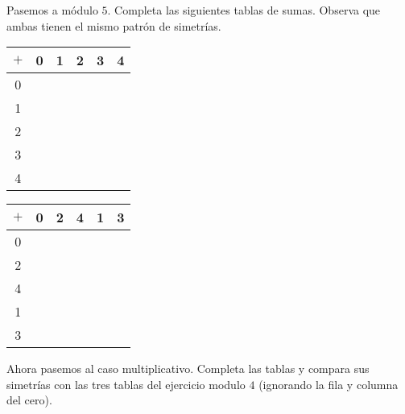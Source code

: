 \begin{ejercicio}
Pasemos a módulo $5$. Completa las siguientes tablas de sumas. Observa que ambas tienen el mismo patrón de simetrías.
 
  \begin{tabular}{|c||c|c|c|c|c|} 
 \hline
  $+$ & 0 & 1 & 2 & 3 & 4\\ 
  \hline
  \hline
  0 &  & & & & \\ 
  \hline
  1 &  & & & &\\
    \hline
  2 &  & & & & \\
      \hline
  3 &  & & & & \\ 
        \hline
  4 &  & & & & \\ 
  \hline
\end{tabular}
\hspace{.5cm}
\begin{tabular}{|c||c|c|c|c|c|} 
 \hline
  $+$ & 0 & 2 & 4 & 1 & 3\\ 
  \hline
  \hline
  0 &  & & & & \\ 
  \hline
  2 &  & & & &\\
    \hline
  4 &  & & & & \\
      \hline
  1 &  & & & & \\ 
        \hline
  3 &  & & & & \\ 
  \hline
\end{tabular}

Ahora pasemos al caso multiplicativo. Completa las tablas y compara sus simetrías con las tres tablas del ejercicio modulo $4$ (ignorando la fila y columna del cero).


\end{ejercicio}

